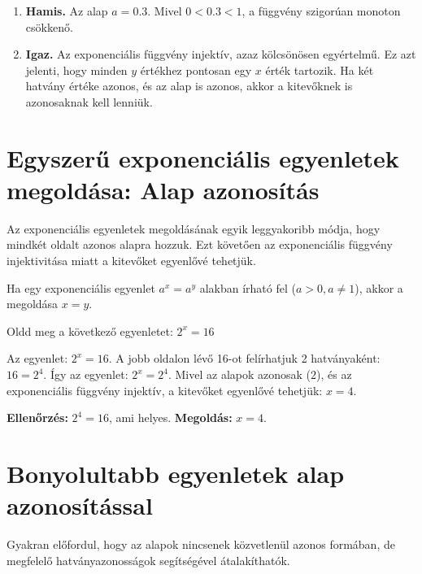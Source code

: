 \documentclass[a4paper,12pt]{article}
\theoremstyle{definition} %
\begin{document}
\begin{megoldasdoboz}
\begin{enumerate}[label=(\alph*)]
    \item \textbf{Hamis.} Az alap $a = 0.3$. Mivel $0 < 0.3 < 1$, a függvény szigorúan monoton csökkenő.
    \item \textbf{Igaz.} Az exponenciális függvény injektív, azaz kölcsönösen egyértelmű. Ez azt jelenti, hogy minden $y$ értékhez pontosan egy $x$ érték tartozik. Ha két hatvány értéke azonos, és az alap is azonos, akkor a kitevőknek is azonosaknak kell lenniük.
\end{enumerate}
\end{megoldasdoboz}

\section*{Egyszerű exponenciális egyenletek megoldása: Alap azonosítás}

Az exponenciális egyenletek megoldásának egyik leggyakoribb módja, hogy mindkét oldalt azonos alapra hozzuk. Ezt követően az exponenciális függvény injektivitása miatt a kitevőket egyenlővé tehetjük.

\begin{teteldoboz}
Ha egy exponenciális egyenlet $a^x = a^y$ alakban írható fel ($a>0, a \neq 1$), akkor a megoldása $x = y$.
\end{teteldoboz}

\begin{feladatdoboz}
Oldd meg a következő egyenletet: $2^x = 16$
\end{feladatdoboz}

\begin{megoldasdoboz}
Az egyenlet: $2^x = 16$.
A jobb oldalon lévő 16-ot felírhatjuk 2 hatványaként: $16 = 2^4$.
Így az egyenlet: $2^x = 2^4$.
Mivel az alapok azonosak ($2$), és az exponenciális függvény injektív, a kitevőket egyenlővé tehetjük:
$x = 4$.

\textbf{Ellenőrzés:} $2^4 = 16$, ami helyes.
\textbf{Megoldás:} $x=4$.
\end{megoldasdoboz}

\section*{Bonyolultabb egyenletek alap azonosítással}

Gyakran előfordul, hogy az alapok nincsenek közvetlenül azonos formában, de megfelelő hatványazonosságok segítségével átalakíthatók.
\end{document}
